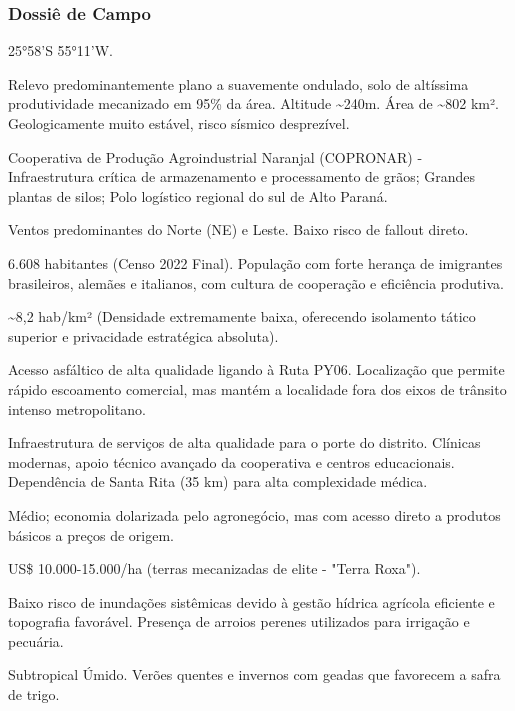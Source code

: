 \subsubsection{Dossiê de Campo}
\begin{description}[style=nextline,leftmargin=0.5cm,font=\bfseries]
\item[Coordenadas]  25°58'S 55°11'W.
\item[Topografia]  Relevo predominantemente plano a suavemente ondulado, solo de altíssima produtividade mecanizado em 95\% da área. Altitude \textasciitilde 240m. Área de \textasciitilde 802 km². Geologicamente muito estável, risco sísmico desprezível.
\item[Alvos Estratégicos]  Cooperativa de Produção Agroindustrial Naranjal (COPRONAR) - Infraestrutura crítica de armazenamento e processamento de grãos; Grandes plantas de silos; Polo logístico regional do sul de Alto Paraná.
\item[Fallout]  Ventos predominantes do Norte (NE) e Leste. Baixo risco de fallout direto.
\item[População]  6.608 habitantes (Censo 2022 Final). População com forte herança de imigrantes brasileiros, alemães e italianos, com cultura de cooperação e eficiência produtiva.
\item[Densidade]  \textasciitilde 8,2 hab/\allowbreak km² (Densidade extremamente baixa, oferecendo isolamento tático superior e privacidade estratégica absoluta).
\item[Vias de Acesso]  Acesso asfáltico de alta qualidade ligando à Ruta PY06. Localização que permite rápido escoamento comercial, mas mantém a localidade fora dos eixos de trânsito intenso metropolitano.
\item[Serviços]  Infraestrutura de serviços de alta qualidade para o porte do distrito. Clínicas modernas, apoio técnico avançado da cooperativa e centros educacionais. Dependência de Santa Rita (35 km) para alta complexidade médica.
\item[Custo de Vida]  Médio; economia dolarizada pelo agronegócio, mas com acesso direto a produtos básicos a preços de origem.
\item[Preço da Terra]  US\$ 10.000-15.000/\allowbreak ha (terras mecanizadas de elite - "Terra Roxa").
\item[Hidrologia]  Baixo risco de inundações sistêmicas devido à gestão hídrica agrícola eficiente e topografia favorável. Presença de arroios perenes utilizados para irrigação e pecuária.
\item[Clima]  Subtropical Úmido. Verões quentes e invernos com geadas que favorecem a safra de trigo.

\end{description}
